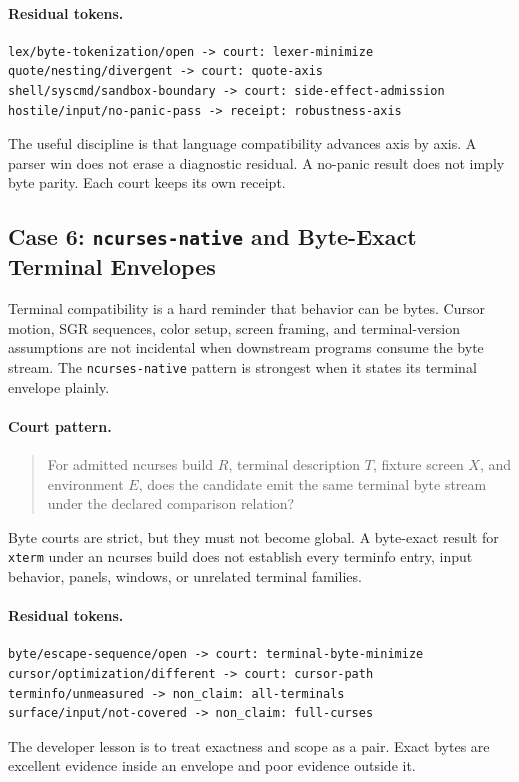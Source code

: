 \documentclass[11pt,a4paper]{article}
\begin{document}
\paragraph{Residual tokens.}
\begin{verbatim}
lex/byte-tokenization/open -> court: lexer-minimize
quote/nesting/divergent -> court: quote-axis
shell/syscmd/sandbox-boundary -> court: side-effect-admission
hostile/input/no-panic-pass -> receipt: robustness-axis
\end{verbatim}
The useful discipline is that language compatibility advances axis by axis. A parser win does not erase a diagnostic residual. A no-panic result does not imply byte parity. Each court keeps its own receipt.

\subsection{Case 6: \texttt{ncurses-native} and Byte-Exact Terminal Envelopes}

Terminal compatibility is a hard reminder that behavior can be bytes. Cursor motion, SGR sequences, color setup, screen framing, and terminal-version assumptions are not incidental when downstream programs consume the byte stream. The \texttt{ncurses-native} pattern is strongest when it states its terminal envelope plainly.

\paragraph{Court pattern.}
\begin{quote}
For admitted ncurses build \(R\), terminal description \(T\), fixture screen \(X\), and environment \(E\), does the candidate emit the same terminal byte stream under the declared comparison relation?
\end{quote}
Byte courts are strict, but they must not become global. A byte-exact result for \texttt{xterm} under an ncurses build does not establish every terminfo entry, input behavior, panels, windows, or unrelated terminal families.

\paragraph{Residual tokens.}
\begin{verbatim}
byte/escape-sequence/open -> court: terminal-byte-minimize
cursor/optimization/different -> court: cursor-path
terminfo/unmeasured -> non_claim: all-terminals
surface/input/not-covered -> non_claim: full-curses
\end{verbatim}
The developer lesson is to treat exactness and scope as a pair. Exact bytes are excellent evidence inside an envelope and poor evidence outside it.
\end{document}

